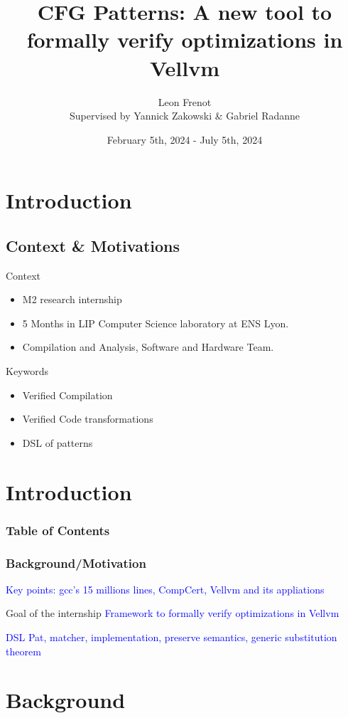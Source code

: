 \documentclass{beamer}
\title{CFG Patterns: A new tool to formally verify optimizations in Vellvm}
\author[Léon Frenot]{Leon Frenot\\ Supervised by Yannick Zakowski \& Gabriel Radanne}
\date[July 12th, 2024]{February 5th, 2024 - July 5th, 2024}
\newcommand{\leon}[1]{\textcolor{blue}{#1}}
\begin{document}
\frame{\titlepage}

\section*{Introduction}

\subsection*{Context \& Motivations}

\begin{frame}
  Context
  \begin{itemize}
    \item M2 research internship
    \item 5 Months in LIP Computer Science laboratory at ENS Lyon.
    \item Compilation and Analysis, Software and Hardware Team.
  \end{itemize}
  Keywords
  \begin{itemize}
    \item Verified Compilation
    \item Verified Code transformations
    \item DSL of patterns
  \end{itemize}
\end{frame}

\section{Introduction}

\begin{frame}
  \frametitle{Table of Contents}
  \tableofcontents
\end{frame}

\begin{frame}
  \frametitle{Background/Motivation}
  \leon{Key points: gcc's 15 millions lines, CompCert, Vellvm and its appliations}
\end{frame}

\begin{frame}
  \begin{block}{Goal of the internship}
    \leon{Framework to formally verify optimizations in Vellvm}
  \end{block}
  \leon{DSL Pat, matcher, implementation, preserve semantics, generic substitution theorem}
\end{frame}

\section{Background}
\end{document}
